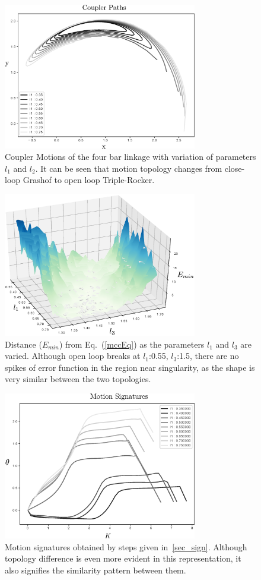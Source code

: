 \documentclass[twocolumn,10pt]{asme2ej}
\newcommand{\req}[1]{(\ref{#1})}
\begin{document}
\begin{figure}
\centering
\includegraphics[width=240pt]{figure/fig_sa_coupler_curves.eps}
  \caption{Coupler Motions of the four bar linkage with variation of parameters $l_1$ and $l_2$. It can be seen that motion topology changes from close-loop Grashof to open loop Triple-Rocker.}
\label{saCouplerCurves}
\end{figure}

\begin{figure}
\centering
\includegraphics[width=240pt]{figure/fig_sa_distance_function.eps}
  \caption{Distance ($E_{min}$) from Eq.~\req{mccEq} as the parameters $l_1$ and $l_3$ are varied. Although open loop breaks at $l_1$:0.55, $l_3$:1.5, there are no spikes of error function in the region near singularity, as the shape is very similar between the two topologies.}
\label{saErrorFunction}
\end{figure}

\begin{figure}
\centering
\includegraphics[width=240pt]{figure/fig_sa_motion_signatures.eps}
  \caption{Motion signatures obtained by steps given in~\ref{sec_sign}. Although topology difference is even more evident in this representation, it also signifies the similarity pattern between them.}
\label{saMotionSignatures}
\end{figure}
\end{document}
